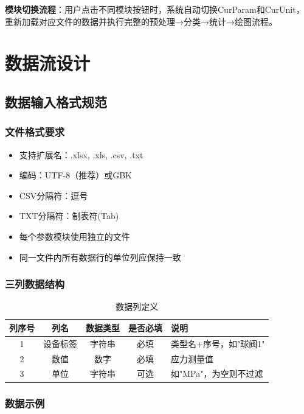 \documentclass[12pt,a3paper]{ctexart}
\begin{document}
\textbf{模块切换流程}：用户点击不同模块按钮时，系统自动切换CurParam和CurUnit，重新加载对应文件的数据并执行完整的预处理→分类→统计→绘图流程。

\section{数据流设计}

\subsection{数据输入格式规范}

\subsubsection{文件格式要求}

\begin{itemize}
    \item 支持扩展名：.xlsx, .xls, .csv, .txt
    \item 编码：UTF-8（推荐）或GBK
    \item CSV分隔符：逗号
    \item TXT分隔符：制表符(Tab)
    \item 每个参数模块使用独立的文件
    \item 同一文件内所有数据行的单位列应保持一致
\end{itemize}

\subsubsection{三列数据结构}

\begin{table}[H]
\centering
\caption{数据列定义}
\begin{tabular}{c|c|c|c|l}
\toprule
\textbf{列序号} & \textbf{列名} & \textbf{数据类型} & \textbf{是否必填} & \textbf{说明} \\
\midrule
1 & 设备标签 & 字符串 & 必填 & 类型名+序号，如"球阀1" \\
2 & 数值 & 数字 & 必填 & 应力测量值 \\
3 & 单位 & 字符串 & 可选 & 如"MPa"，为空则不过滤 \\
\bottomrule
\end{tabular}
\end{table}

\subsubsection{数据示例}
\end{document}
